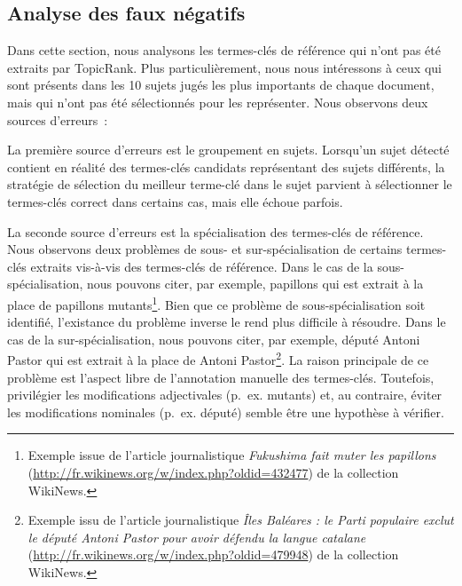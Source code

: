   \subsection{Analyse des faux négatifs}
  \label{subsec:analyse_faux_négatifs}
    Dans cette section, nous analysons les termes-clés de référence qui n'ont
    pas été extraits par TopicRank. Plus particulièrement, nous nous intéressons
    à ceux qui sont présents dans les 10 sujets jugés les plus importants de
    chaque document, mais qui n'ont pas été sélectionnés pour les représenter.
    Nous observons deux sources d'erreurs~:

    La première source d'erreurs est le groupement en sujets. Lorsqu'un sujet
    détecté contient en réalité des termes-clés candidats représentant des
    sujets différents, la stratégie de sélection du meilleur terme-clé dans le
    sujet parvient à sélectionner le termes-clés correct dans certains cas, mais
    elle échoue parfois.

    La seconde source d'erreurs est la spécialisation des termes-clés de
    référence. Nous observons deux problèmes de sous- et sur-spécialisation de
    certains termes-clés extraits vis-à-vis des termes-clés de référence. Dans
    le cas de la sous-spécialisation, nous pouvons citer, par exemple,
    \og{}papillons\fg{} qui est extrait à la place de \og{}papillons
    mutants\fg{}\footnote{Exemple issue de l'article journalistique
    \textit{Fukushima fait muter les papillons}
    (\url{http://fr.wikinews.org/w/index.php?oldid=432477}) de la collection
    WikiNews.}. Bien que ce problème de sous-spécialisation soit identifié,
    l'existance du problème inverse le rend plus difficile à résoudre. Dans le
    cas de la sur-spécialisation, nous pouvons citer, par exemple, \og{}député
    Antoni Pastor\fg{} qui est extrait à la place de \og{}Antoni
    Pastor\fg{}\footnote{Exemple issu de l'article journalistique \textit{Îles
    Baléares : le Parti populaire exclut le député Antoni Pastor pour avoir
    défendu la langue catalane}
    (\url{http://fr.wikinews.org/w/index.php?oldid=479948}) de la collection
    WikiNews.}. La raison principale de ce problème est l'aspect libre de
    l'annotation manuelle des termes-clés. Toutefois, privilégier les
    modifications adjectivales (p.~ex. \og{}mutants\fg{}) et, au contraire,
    éviter les modifications nominales (p.~ex. \og{}député\fg{}) semble être une
    hypothèse à vérifier.

